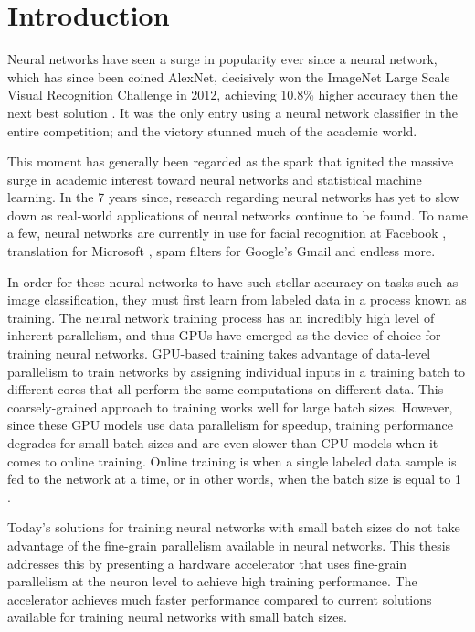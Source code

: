 \chapter{Introduction}
Neural networks have seen a surge in popularity ever since a neural network, which has since been coined AlexNet, decisively won the ImageNet Large Scale Visual Recognition Challenge in 2012, achieving 10.8\% higher accuracy then the next best solution \cite{Krizhevsky}. It was the only entry using a neural network classifier in the entire competition; and the victory stunned much of the academic world.

This moment has generally been regarded as the spark that ignited the massive surge in academic interest toward neural networks and statistical machine learning. In the 7 years since, research regarding neural networks has yet to slow down as real-world applications of neural networks continue to be found. To name a few, neural networks are currently in use for facial recognition at Facebook \cite{deepface}, translation for Microsoft \cite{translation}, spam filters for Google's Gmail \cite{gmail} and endless more.

In order for these neural networks to have such stellar accuracy on tasks such as image classification, they must first learn from labeled data in a process known as training. The neural network training process has an incredibly high level of inherent parallelism, and thus GPUs have emerged as the device of choice for training neural networks. GPU-based training takes advantage of data-level parallelism to train networks by assigning individual inputs in a training batch to different cores that all perform the same computations on different data. This coarsely-grained approach to training works well for large batch sizes. However, since these GPU models use data parallelism for speedup, training performance degrades for small batch sizes and are even slower than CPU models when it comes to online training. Online training is when a single labeled data sample is fed to the network at a time, or in other words, when the batch size is equal to 1 \cite{batch-size}. 

Today's solutions for training neural networks with small batch sizes do not take advantage of the fine-grain parallelism available in neural networks. This thesis addresses this by presenting a hardware accelerator that uses fine-grain parallelism at the neuron level to achieve high training performance. The accelerator achieves much faster performance compared to current solutions available for training neural networks with small batch sizes.

